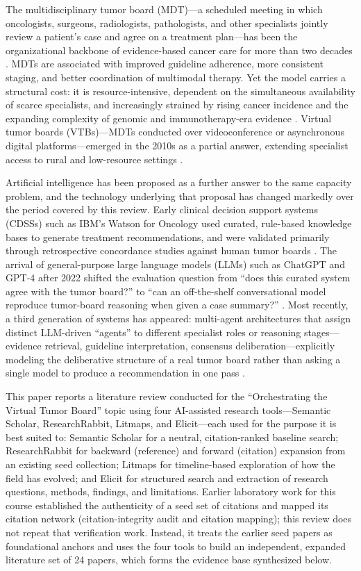 \documentclass{article}
\begin{document}
The multidisciplinary tumor board (MDT)---a scheduled meeting in which oncologists, surgeons, radiologists, pathologists, and other specialists jointly review a patient's case and agree on a treatment plan---has been the organizational backbone of evidence-based cancer care for more than two decades \cite{patkar2011}. MDTs are associated with improved guideline adherence, more consistent staging, and better coordination of multimodal therapy. Yet the model carries a structural cost: it is resource-intensive, dependent on the simultaneous availability of scarce specialists, and increasingly strained by rising cancer incidence and the expanding complexity of genomic and immunotherapy-era evidence \cite{liu2026,wu2026}. Virtual tumor boards (VTBs)---MDTs conducted over videoconference or asynchronous digital platforms---emerged in the 2010s as a partial answer, extending specialist access to rural and low-resource settings \cite{marshall2014,thiagarajan2023}.

Artificial intelligence has been proposed as a further answer to the same capacity problem, and the technology underlying that proposal has changed markedly over the period covered by this review. Early clinical decision support systems (CDSSs) such as IBM's Watson for Oncology used curated, rule-based knowledge bases to generate treatment recommendations, and were validated primarily through retrospective concordance studies against human tumor boards \cite{somashekhar2018,jie2021}. The arrival of general-purpose large language models (LLMs) such as ChatGPT and GPT-4 after 2022 shifted the evaluation question from ``does this curated system agree with the tumor board?'' to ``can an off-the-shelf conversational model reproduce tumor-board reasoning when given a case summary?'' \cite{aliyev2026,chatziisaak2025}. Most recently, a third generation of systems has appeared: multi-agent architectures that assign distinct LLM-driven ``agents'' to different specialist roles or reasoning stages---evidence retrieval, guideline interpretation, consensus deliberation---explicitly modeling the deliberative structure of a real tumor board rather than asking a single model to produce a recommendation in one pass \cite{liu2026,han2025,saenz2026}.

This paper reports a literature review conducted for the ``Orchestrating the Virtual Tumor Board'' topic using four AI-assisted research tools---Semantic Scholar, ResearchRabbit, Litmaps, and Elicit---each used for the purpose it is best suited to: Semantic Scholar for a neutral, citation-ranked baseline search; ResearchRabbit for backward (reference) and forward (citation) expansion from an existing seed collection; Litmaps for timeline-based exploration of how the field has evolved; and Elicit for structured search and extraction of research questions, methods, findings, and limitations. Earlier laboratory work for this course established the authenticity of a seed set of citations and mapped its citation network (citation-integrity audit and citation mapping); this review does not repeat that verification work. Instead, it treats the earlier seed papers as foundational anchors and uses the four tools to build an independent, expanded literature set of 24 papers, which forms the evidence base synthesized below.
\end{document}
